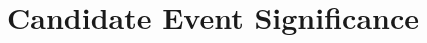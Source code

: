 \documentclass[binding=0.6cm, LaM]{sapthesis}
\begin{document}
%
%	
%	
%
%
%
%
%
\section{Candidate Event Significance}
\end{document}
